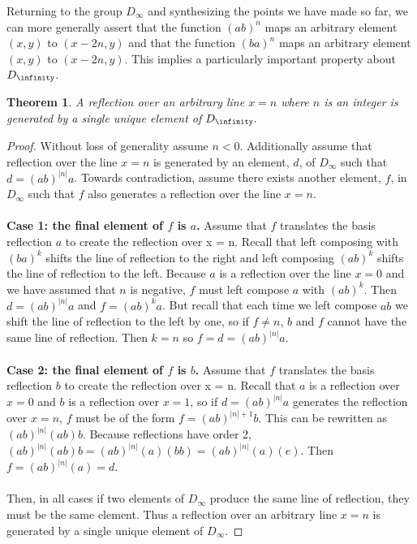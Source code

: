 \documentclass{article}
\newtheorem{theorem}{Theorem}
\theoremstyle{definition}
\begin{document}
\noindent Returning to the group $D_{\infty}$ and synthesizing the points we have made so far, we can more generally assert that the function $(ab)^n$ maps an arbitrary element $(x,y)$ to $(x-2n, y)$ and that the function $(ba)^n$ maps an arbitrary element $(x,y)$ to $(x-2n,y)$. This implies a particularly important property about $D_{\infinity}$. 

\begin{theorem}
    A reflection over an arbitrary line $x = n$ where $n$ is an integer is generated by a single unique element of $D_{\infinity}.$
\end{theorem}
\begin{proof}
    Without loss of generality assume $n < 0$. Additionally assume that reflection over the line $x = n$ is generated by an element, $d$, of $D_{\infty}$ such that $d = (ab)^{|n|}a$. Towards contradiction, assume there exists another element, $f$, in $D_{\infty}$ such that $f$ also generates a reflection over the line $x = n$. \\
\\
    \textbf{Case 1: the final element of $f$ is $a$.} Assume that $f$ translates the basis reflection $a$ to create the reflection over x = n. Recall that left composing with $(ba)^{k}$ shifts the line of reflection to the right and left composing $(ab)^{k}$ shifts the line of reflection to the left. Because $a$ is a reflection over the line $x = 0$ and we have assumed that $n$ is negative, $f$ must left compose $a$ with $(ab)^{k}$. Then $d = (ab)^{|n|}a$ and $f = (ab)^{k}a$. But recall that each time we left compose $ab$ we shift the line of reflection to the left by one, so if $f \neq n$, $b$ and $f$ cannot have the same line of reflection. Then $k = n$ so $f = d = (ab)^{|n|}a$. \\
    \\
    \textbf{Case 2: the final element of $f$ is $b$.} Assume that $f$ translates the basis reflection $b$ to create the reflection over x = n. Recall that $a$ is a reflection over $x = 0$ and $b$ is a reflection over $x = 1$, so if $d = (ab)^{|n|}a$ generates the reflection over $x = n$, $f$ must be of the form $f = (ab)^{|n| + 1}b$. This can be rewritten as $(ab)^{|n|}(ab)b$. Because reflections have order 2, $(ab)^{|n|}(ab)b = (ab)^{|n|}(a)(bb) = (ab)^{|n|}(a)(e)$. Then $f = (ab)^{|n|}(a) = d$.\\
\\
    \noindent Then, in all cases if two elements of $D_{\infty}$ produce the same line of reflection, they must be the same element. Thus a reflection over an arbitrary line $x = n$ is generated by a single unique element of $D_{\infty}$.
\end{proof}
\end{document}
